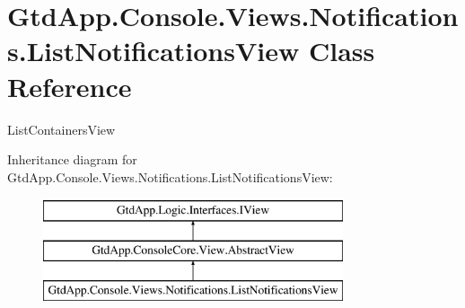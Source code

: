 \hypertarget{class_gtd_app_1_1_console_1_1_views_1_1_notifications_1_1_list_notifications_view}{}\section{Gtd\+App.\+Console.\+Views.\+Notifications.\+List\+Notifications\+View Class Reference}
\label{class_gtd_app_1_1_console_1_1_views_1_1_notifications_1_1_list_notifications_view}


List\+Containers\+View  


Inheritance diagram for Gtd\+App.\+Console.\+Views.\+Notifications.\+List\+Notifications\+View\+:\begin{figure}[H]
\begin{center}
\leavevmode
\includegraphics[height=3.000000cm]{class_gtd_app_1_1_console_1_1_views_1_1_notifications_1_1_list_notifications_view}
\end{center}
\end{figure}
